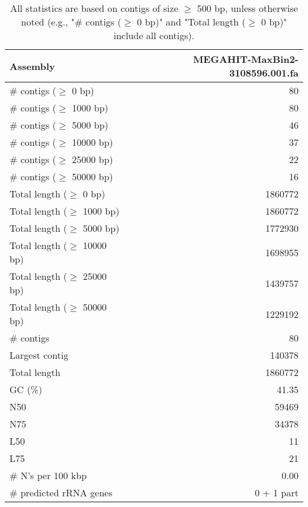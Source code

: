 \documentclass[12pt,a4paper]{article}
\begin{document}
\begin{table}[ht]
\begin{center}
\caption{All statistics are based on contigs of size $\geq$ 500 bp, unless otherwise noted (e.g., "\# contigs ($\geq$ 0 bp)" and "Total length ($\geq$ 0 bp)" include all contigs).}
\begin{tabular}{|l*{1}{|r}|}
\hline
Assembly & MEGAHIT-MaxBin2-3108596.001.fa \\ \hline
\# contigs ($\geq$ 0 bp) & 80 \\ \hline
\# contigs ($\geq$ 1000 bp) & 80 \\ \hline
\# contigs ($\geq$ 5000 bp) & 46 \\ \hline
\# contigs ($\geq$ 10000 bp) & 37 \\ \hline
\# contigs ($\geq$ 25000 bp) & 22 \\ \hline
\# contigs ($\geq$ 50000 bp) & 16 \\ \hline
Total length ($\geq$ 0 bp) & 1860772 \\ \hline
Total length ($\geq$ 1000 bp) & 1860772 \\ \hline
Total length ($\geq$ 5000 bp) & 1772930 \\ \hline
Total length ($\geq$ 10000 bp) & 1698955 \\ \hline
Total length ($\geq$ 25000 bp) & 1439757 \\ \hline
Total length ($\geq$ 50000 bp) & 1229192 \\ \hline
\# contigs & 80 \\ \hline
Largest contig & 140378 \\ \hline
Total length & 1860772 \\ \hline
GC (\%) & 41.35 \\ \hline
N50 & 59469 \\ \hline
N75 & 34378 \\ \hline
L50 & 11 \\ \hline
L75 & 21 \\ \hline
\# N's per 100 kbp & 0.00 \\ \hline
\# predicted rRNA genes & 0 + 1 part \\ \hline
\end{tabular}
\end{center}
\end{table}
\end{document}
